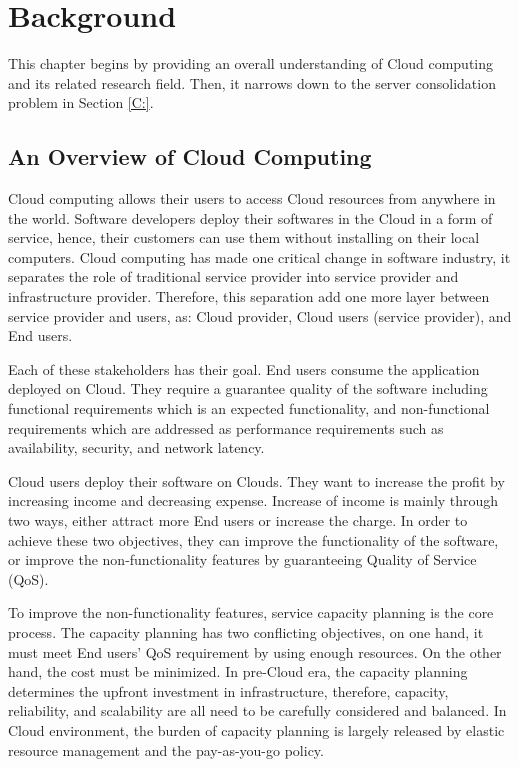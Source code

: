 \section{Background}

This chapter begins by providing an overall understanding of Cloud computing and its related research field.
Then, it narrows down to the server consolidation problem in Section \ref{C:}. 

\subsection{An Overview of Cloud Computing}

Cloud computing allows their users to access Cloud resources from anywhere in the world. Software developers deploy their softwares in the Cloud in a form of service, hence, their customers can use them without installing on their local computers. Cloud computing has made one critical change in software industry, it separates the role of traditional service provider into service provider and infrastructure provider.  Therefore, this separation add one more layer between service provider and users, as: Cloud provider, Cloud users (service provider), and End users. 

Each of these stakeholders has their goal. 
End users consume the application deployed on Cloud. They require a guarantee quality of the software including functional requirements which is an expected functionality, and non-functional requirements which are addressed as performance requirements such as availability, security, and network latency.

Cloud users deploy their software on Clouds. They want to increase the profit by increasing income and decreasing expense. Increase of income is mainly through two ways, either attract more End users or increase the charge. In order to achieve these two objectives, they can improve the functionality of the software, or improve the non-functionality features by guaranteeing Quality of Service (QoS). 

To improve the non-functionality features, service capacity planning is the core process. The capacity planning has two conflicting objectives, on one hand, it must meet End users' QoS requirement by using enough resources.  On the other hand, the cost must be minimized. In pre-Cloud era, the capacity planning determines the upfront investment in infrastructure, therefore, capacity, reliability, and scalability are all need to be carefully considered and balanced. In Cloud environment, the burden of capacity planning is largely released by elastic resource management and the pay-as-you-go policy.

